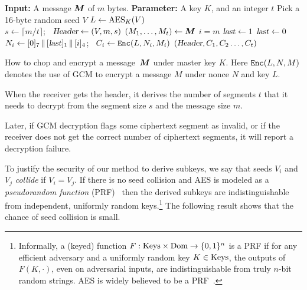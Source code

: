 \IncMargin{1em}
\begin{algorithm}[h]
  \DontPrintSemicolon
  \BlankLine
    \textbf{Input:} A message $\bm{M}$ of $m$ bytes. \;
    \textbf{Parameter:} A key $K$, and an integer $t$  \;
    Pick a 16-byte random seed $V$ \;
    $L \gets \mathrm{AES}_K(V)$ \\
    $s \gets \lceil m / t \rceil$;~ $\textsl{Header} \gets (V, m, s)$ \;  
    $(M_1, \ldots, M_t) \gets \bm{M}$ \;
     {
    \IF $i = m$ \THEN $\textsl{last} \gets 1$ \ELSE $\textsl{last} \gets 0$   \;
     $N_i \gets [0]_7 {\,\|\,} [\textsl{last}]_1 {\,\|\,} [i]_4$;~ $C_i \gets \texttt{Enc}(L, N_i, M_i)$ \;
    }
    \Return $(\textsl{Header}, C_1, C_2\ldots, C_t)$
  \caption{How to chop and encrypt a message~$\bm{M}$ under master key $K$.
   Here $\texttt{Enc}(L, N, M)$ denotes the use of GCM to encrypt a message $M$
   under nonce $N$ and key $L$.
  }\label{algo:chop}
\end{algorithm}\DecMargin{1em}

When the receiver gets the header, it %
derives the number of segments $t$ that it needs to decrypt from the segment size $s$
and the message size $m$.

Later, if GCM decryption flags some ciphertext segment as invalid,
or if the receiver does not get the correct number of ciphertext segments,
it will report a decryption failure.

To justify the security of our method to derive subkeys,
we say that seeds $V_i$ and $V_j$ \emph{collide} if  $V_i = V_j$.
If there is no seed collision
and %
AES is modeled as a \emph{pseudorandom function} (PRF)~\cite{GGM86}
then the derived subkeys are indistinguishable from independent, uniformly random keys.\footnote{
Informally, a (keyed) function $F: \mathrm{Keys} \times \mathrm{Dom} \to \{0,1\}^n$
is a PRF if for any efficient adversary and a uniformly random key $K \in \mathrm{Keys}$,
the outputs of $F(K, \cdot)$, even on adversarial inputs,
are indistinguishable from truly $n$-bit random strings.
AES is widely believed to be a PRF~\cite[page 225]{Book:KL14}.
}
The following result shows that the chance of seed collision is small.


